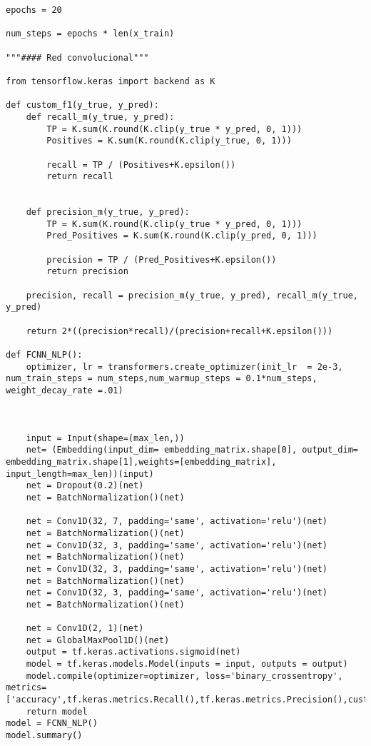 \documentclass[10pt,riqno,a4paper,twoside]{article}\usepackage[]{graphicx}\usepackage[]{color}
\begin{document}
\begin{lstlisting}
epochs = 20 

num_steps = epochs * len(x_train)

"""#### Red convolucional"""

from tensorflow.keras import backend as K

def custom_f1(y_true, y_pred):    
    def recall_m(y_true, y_pred):
        TP = K.sum(K.round(K.clip(y_true * y_pred, 0, 1)))
        Positives = K.sum(K.round(K.clip(y_true, 0, 1)))
        
        recall = TP / (Positives+K.epsilon())    
        return recall 
    
    
    def precision_m(y_true, y_pred):
        TP = K.sum(K.round(K.clip(y_true * y_pred, 0, 1)))
        Pred_Positives = K.sum(K.round(K.clip(y_pred, 0, 1)))
    
        precision = TP / (Pred_Positives+K.epsilon())
        return precision 
    
    precision, recall = precision_m(y_true, y_pred), recall_m(y_true, y_pred)
    
    return 2*((precision*recall)/(precision+recall+K.epsilon()))

def FCNN_NLP():
    optimizer, lr = transformers.create_optimizer(init_lr  = 2e-3, num_train_steps = num_steps,num_warmup_steps = 0.1*num_steps, weight_decay_rate =.01)



    input = Input(shape=(max_len,))
    net= (Embedding(input_dim= embedding_matrix.shape[0], output_dim= embedding_matrix.shape[1],weights=[embedding_matrix], input_length=max_len))(input)
    net = Dropout(0.2)(net)
    net = BatchNormalization()(net)
    
    net = Conv1D(32, 7, padding='same', activation='relu')(net)
    net = BatchNormalization()(net)
    net = Conv1D(32, 3, padding='same', activation='relu')(net)
    net = BatchNormalization()(net)
    net = Conv1D(32, 3, padding='same', activation='relu')(net)
    net = BatchNormalization()(net)
    net = Conv1D(32, 3, padding='same', activation='relu')(net)
    net = BatchNormalization()(net)
    
    net = Conv1D(2, 1)(net)
    net = GlobalMaxPool1D()(net)
    output = tf.keras.activations.sigmoid(net)
    model = tf.keras.models.Model(inputs = input, outputs = output)
    model.compile(optimizer=optimizer, loss='binary_crossentropy', metrics=['accuracy',tf.keras.metrics.Recall(),tf.keras.metrics.Precision(),custom_f1])
    return model
model = FCNN_NLP()
model.summary()


\end{lstlisting}
\end{document}
